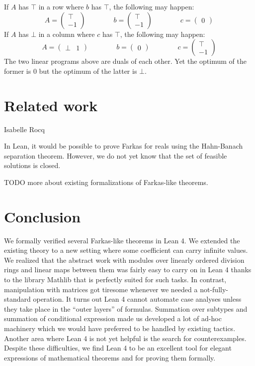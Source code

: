 \documentclass[]{article}
\renewcommand{\.}{\hskip .75pt}
\begin{document}
If $A$ has $\top$ in a row where $b$ has $\top$, the following may happen:
$$
A = \begin{pmatrix} \top \\ -1 \end{pmatrix}
\qquad \qquad
b = \begin{pmatrix} \top \\ -1 \end{pmatrix}
\qquad \qquad
c = \begin{pmatrix} 0 \end{pmatrix}
$$
If $A$ has $\bot$ in a column where $c$ has $\top$, the following may happen:
$$
A = \begin{pmatrix} \bot & 1 \end{pmatrix}
\qquad \qquad
b = \begin{pmatrix} 0 \end{pmatrix}
\qquad \qquad
c = \begin{pmatrix} \top \\ -1 \end{pmatrix}
$$
The two linear programs above are duals of each other.
Yet the optimum of the former is $0$
but the optimum of the latter is $\bot$.


\section {Related work}

Isabelle \cite{Farkas-AFP} \cite{Linear-AFP} \cite{Duality-AFP}
Rocq \cite{Simplex-Coq}

In Lean, it would be possible to prove Farkas for reals using the
Hahn-Banach separation theorem. However, we do not yet know that
the set of feasible solutions is closed.

TODO more about existing formalizations of Farkas-like theorems.


\section {Conclusion}

We formally verified several Farkas-like theorems in Lean 4.
We extended the existing theory to a new setting where some
coefficient can carry infinite values. We realized that the
abstract work with modules over linearly ordered division rings
and linear maps between them was fairly easy to carry on in
Lean 4 thanks to the library Mathlib that is perfectly suited
for such tasks. In contrast, manipulation with matrices got
tiresome whenever we needed a not-fully-standard operation.
It turns out Lean 4 cannot automate case analyses unless they
take place in the ``outer layers'' of formulas. Summation
over subtypes and summation of conditional expression made
us developed a lot of ad-hoc machinery which we would have
preferred to be handled by existing tactics. Another area
where Lean 4 is not yet helpful is the search for counterexamples.
Despite these difficulties, we find Lean 4 to be an excellent
tool for elegant expressions of mathematical theorems and
for proving them formally.
\end{document}
